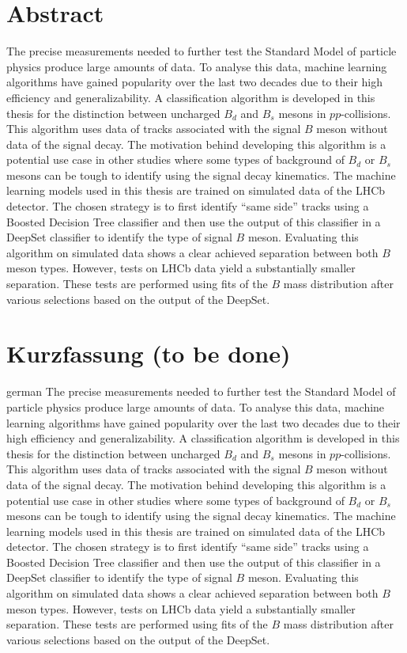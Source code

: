 \thispagestyle{plain}

\section*{Abstract} %
The precise measurements needed to further test the Standard Model of particle physics produce large amounts of data.
To analyse this data, machine learning algorithms have gained popularity over the last two decades due to their high efficiency and generalizability.
A classification algorithm is developed in this thesis for the distinction between uncharged $B_d$ and $B_s$ mesons in $pp$-collisions.
This algorithm uses data of tracks associated with the signal $B$ meson without data of the signal decay. 
The motivation behind developing this algorithm is a potential use case in other studies where some types of background of $B_d$ or $B_s$ mesons can be tough to identify using the signal decay kinematics.
The machine learning models used in this thesis are trained on simulated data of the LHCb detector. %
The chosen strategy is to first identify \enquote{same side} tracks using a Boosted Decision Tree classifier and then use the output of this classifier in a DeepSet classifier to identify the type of signal $B$ meson.
Evaluating this algorithm on simulated data shows a clear achieved separation between both $B$ meson types.
However, tests on LHCb data yield a substantially smaller separation.
These tests are performed using fits of the $B$ mass distribution after various selections based on the output of the DeepSet.

\section*{Kurzfassung (to be done)} %
\begin{foreignlanguage}{german}
    The precise measurements needed to further test the Standard Model of particle physics produce large amounts of data.
    To analyse this data, machine learning algorithms have gained popularity over the last two decades due to their high efficiency and generalizability.
    A classification algorithm is developed in this thesis for the distinction between uncharged $B_d$ and $B_s$ mesons in $pp$-collisions.
    This algorithm uses data of tracks associated with the signal $B$ meson without data of the signal decay. 
    The motivation behind developing this algorithm is a potential use case in other studies where some types of background of $B_d$ or $B_s$ mesons can be tough to identify using the signal decay kinematics.
    The machine learning models used in this thesis are trained on simulated data of the LHCb detector. %
    The chosen strategy is to first identify \enquote{same side} tracks using a Boosted Decision Tree classifier and then use the output of this classifier in a DeepSet classifier to identify the type of signal $B$ meson.
    Evaluating this algorithm on simulated data shows a clear achieved separation between both $B$ meson types.
    However, tests on LHCb data yield a substantially smaller separation.
    These tests are performed using fits of the $B$ mass distribution after various selections based on the output of the DeepSet.
\end{foreignlanguage}
